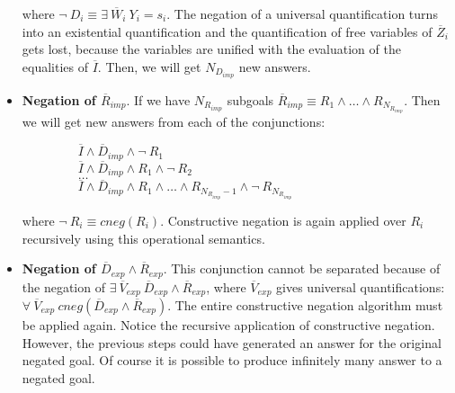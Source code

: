 \documentclass{llncs}
\begin{document}
\begin{itemize}
           where $ \neg~ D_i \equiv \exists~
           \overline{W}_i~ Y_i = s_i$. The negation of a universal
           quantification turns into an existential quantification and
           the quantification of free variables of $\overline{Z}_i$
           gets lost, because the variables are unified with the evaluation of
           the equalities of $\overline{I}$. Then, we will get
           $N_{D_{imp}}$ new answers.


           \item {\bf Negation of $\overline{R}_{imp}$}. If we have
           $N_{R_{imp}}$ subgoals $\overline{R}_{imp} \equiv R_1
           \wedge \ldots \wedge R_{N_{R_{imp}}}$. Then we will get
           new answers from each of the conjunctions: 

           $~~~~~~~~~~~~~~~~~~~~\overline{I} \wedge \overline{D}_{imp} \wedge \neg~ R_1 $ \\ 
           $~~~~~~~~~~~~~~~~~~~~\overline{I} \wedge \overline{D}_{imp} \wedge
           R_1 \wedge \neg~ R_2 $ \\ 
           $~~~~~~~~~~~~~~~~~~~~\ldots $ \\ 
           $~~~~~~~~~~~~~~~~~~~~\overline{I} \wedge \overline{D}_{imp} \wedge
           R_1 \wedge \ldots \wedge R_{N_{R_{imp}}-1} \wedge \neg~
           R_{N_{R_{imp}}}$ 

           where $ \neg~ R_i \equiv cneg(R_i)$. Constructive negation
           is again applied over $R_i$ recursively using this
           operational semantics.


           \item {\bf Negation of $\overline{D}_{exp} \wedge
           \overline{R}_{exp}$}. This conjunction cannot be separated
           because of the negation of $ \exists~ \overline{V}_{exp}~
           \overline{D}_{exp} \wedge \overline{R}_{exp}$, where
           $\overline{V}_{exp}$ gives universal quantifications:\\
           $\forall~ \overline{V}_{exp}~ cneg(\overline{D}_{exp}
           \wedge \overline{R}_{exp})$. The entire constructive
           negation algorithm must be applied again. Notice the
           recursive application of constructive negation. However,
           the previous steps could have generated an answer for the
           original negated goal. Of course it is possible to produce
           infinitely many answer to a negated goal.


\end{itemize}
\end{document}
